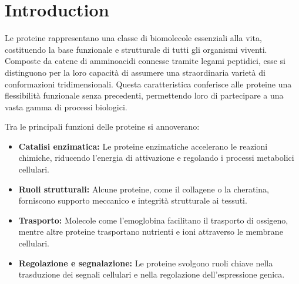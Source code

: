 \documentclass[Lau,binding=0.6cm,oneside,noexaminfo]{sapthesis}
\title{}
\author{}
\begin{document}
\frontmatter

\maketitle





    

\dedication{}


\newpage
\null
\thispagestyle{empty}
\newpage

\tableofcontents



\newpage
\null
\thispagestyle{empty}
\newpage


\mainmatter

\chapter*{Introduction}
Le proteine rappresentano una classe di biomolecole essenziali alla vita, costituendo la base funzionale e strutturale di tutti gli organismi viventi. Composte da catene di amminoacidi connesse tramite legami peptidici, esse si distinguono per la loro capacità di assumere una straordinaria varietà di conformazioni tridimensionali. Questa caratteristica conferisce alle proteine una flessibilità funzionale senza precedenti, permettendo loro di partecipare a una vasta gamma di processi biologici.

Tra le principali funzioni delle proteine si annoverano:
\begin{itemize}
    \item \textbf{Catalisi enzimatica:} Le proteine enzimatiche accelerano le reazioni chimiche, riducendo l'energia di attivazione e regolando i processi metabolici cellulari.
    \item \textbf{Ruoli strutturali:} Alcune proteine, come il collagene o la cheratina, forniscono supporto meccanico e integrità strutturale ai tessuti.
    \item \textbf{Trasporto:} Molecole come l'emoglobina facilitano il trasporto di ossigeno, mentre altre proteine trasportano nutrienti e ioni attraverso le membrane cellulari.
    \item \textbf{Regolazione e segnalazione:} Le proteine svolgono ruoli chiave nella trasduzione dei segnali cellulari e nella regolazione dell'espressione genica.
\end{itemize}
\end{document}
